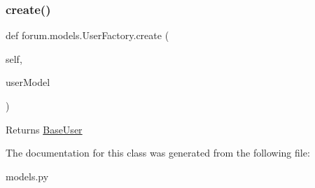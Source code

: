 \subsubsection{\texorpdfstring{create()}{create()}}
{\footnotesize\ttfamily def forum.\+models.\+User\+Factory.\+create (\begin{DoxyParamCaption}\item[{}]{self,  }\item[{}]{user\+Model }\end{DoxyParamCaption})}

\begin{DoxyReturn}{Returns}
\mbox{\hyperlink{classforum_1_1models_1_1_base_user}{Base\+User}} 
\end{DoxyReturn}


The documentation for this class was generated from the following file\+:\begin{DoxyCompactItemize}
\item 
models.\+py\end{DoxyCompactItemize}
